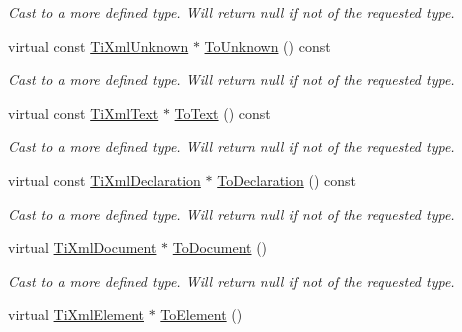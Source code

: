 \begin{DoxyCompactItemize}
\begin{DoxyCompactList}\small\item\em Cast to a more defined type. Will return null if not of the requested type. \end{DoxyCompactList}\item 
\hypertarget{class_ti_xml_node_afd7205cf31d7a376929f8a36930627a2}{virtual const \hyperlink{class_ti_xml_unknown}{Ti\-Xml\-Unknown} $\ast$ \hyperlink{class_ti_xml_node_afd7205cf31d7a376929f8a36930627a2}{To\-Unknown} () const }\label{class_ti_xml_node_afd7205cf31d7a376929f8a36930627a2}

\begin{DoxyCompactList}\small\item\em Cast to a more defined type. Will return null if not of the requested type. \end{DoxyCompactList}\item 
\hypertarget{class_ti_xml_node_a95a46a52c525992d6b4ee08beb14cd69}{virtual const \hyperlink{class_ti_xml_text}{Ti\-Xml\-Text} $\ast$ \hyperlink{class_ti_xml_node_a95a46a52c525992d6b4ee08beb14cd69}{To\-Text} () const }\label{class_ti_xml_node_a95a46a52c525992d6b4ee08beb14cd69}

\begin{DoxyCompactList}\small\item\em Cast to a more defined type. Will return null if not of the requested type. \end{DoxyCompactList}\item 
\hypertarget{class_ti_xml_node_a9f43e6984fc7d4afd6eb32714c6b7b72}{virtual const \hyperlink{class_ti_xml_declaration}{Ti\-Xml\-Declaration} $\ast$ \hyperlink{class_ti_xml_node_a9f43e6984fc7d4afd6eb32714c6b7b72}{To\-Declaration} () const }\label{class_ti_xml_node_a9f43e6984fc7d4afd6eb32714c6b7b72}

\begin{DoxyCompactList}\small\item\em Cast to a more defined type. Will return null if not of the requested type. \end{DoxyCompactList}\item 
\hypertarget{class_ti_xml_node_a6a4c8ac28ee7a745d059db6691e03bae}{virtual \hyperlink{class_ti_xml_document}{Ti\-Xml\-Document} $\ast$ \hyperlink{class_ti_xml_node_a6a4c8ac28ee7a745d059db6691e03bae}{To\-Document} ()}\label{class_ti_xml_node_a6a4c8ac28ee7a745d059db6691e03bae}

\begin{DoxyCompactList}\small\item\em Cast to a more defined type. Will return null if not of the requested type. \end{DoxyCompactList}\item 
\hypertarget{class_ti_xml_node_aa65d000223187d22a4dcebd7479e9ebc}{virtual \hyperlink{class_ti_xml_element}{Ti\-Xml\-Element} $\ast$ \hyperlink{class_ti_xml_node_aa65d000223187d22a4dcebd7479e9ebc}{To\-Element} ()}\label{class_ti_xml_node_aa65d000223187d22a4dcebd7479e9ebc}


\end{DoxyCompactItemize}
